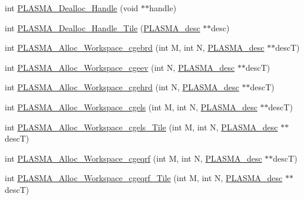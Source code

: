 \begin{DoxyCompactItemize}
\item 
int \hyperlink{group__Auxiliary_gaa9eda06e52cb5dc6d0bda9a21cde8b1f_gaa9eda06e52cb5dc6d0bda9a21cde8b1f}{P\+L\+A\+S\+M\+A\+\_\+\+Dealloc\+\_\+\+Handle} (void $\ast$$\ast$handle)
\item 
int \hyperlink{group__Auxiliary_gace7f20780aab355943e7d16dd285f051_gace7f20780aab355943e7d16dd285f051}{P\+L\+A\+S\+M\+A\+\_\+\+Dealloc\+\_\+\+Handle\+\_\+\+Tile} (\hyperlink{structplasma__desc__t}{P\+L\+A\+S\+M\+A\+\_\+desc} $\ast$$\ast$desc)
\item 
int \hyperlink{group__Auxiliary_ga9347ba6bb13a85aec69faa151a4679cc_ga9347ba6bb13a85aec69faa151a4679cc}{P\+L\+A\+S\+M\+A\+\_\+\+Alloc\+\_\+\+Workspace\+\_\+cgebrd} (int M, int N, \hyperlink{structplasma__desc__t}{P\+L\+A\+S\+M\+A\+\_\+desc} $\ast$$\ast$desc\+T)
\item 
int \hyperlink{group__Auxiliary_gae0761822c4284e93410cc0c4d3b9481d_gae0761822c4284e93410cc0c4d3b9481d}{P\+L\+A\+S\+M\+A\+\_\+\+Alloc\+\_\+\+Workspace\+\_\+cgeev} (int N, \hyperlink{structplasma__desc__t}{P\+L\+A\+S\+M\+A\+\_\+desc} $\ast$$\ast$desc\+T)
\item 
int \hyperlink{group__Auxiliary_gaf3a8bf0773137be15a83eee6c275cc39_gaf3a8bf0773137be15a83eee6c275cc39}{P\+L\+A\+S\+M\+A\+\_\+\+Alloc\+\_\+\+Workspace\+\_\+cgehrd} (int N, \hyperlink{structplasma__desc__t}{P\+L\+A\+S\+M\+A\+\_\+desc} $\ast$$\ast$desc\+T)
\item 
int \hyperlink{group__Auxiliary_ga8651b83a212d76deebb60a569f9e1e81_ga8651b83a212d76deebb60a569f9e1e81}{P\+L\+A\+S\+M\+A\+\_\+\+Alloc\+\_\+\+Workspace\+\_\+cgels} (int M, int N, \hyperlink{structplasma__desc__t}{P\+L\+A\+S\+M\+A\+\_\+desc} $\ast$$\ast$desc\+T)
\item 
int \hyperlink{group__Auxiliary_gaa18fd044b60c50604149bfff131223ce_gaa18fd044b60c50604149bfff131223ce}{P\+L\+A\+S\+M\+A\+\_\+\+Alloc\+\_\+\+Workspace\+\_\+cgels\+\_\+\+Tile} (int M, int N, \hyperlink{structplasma__desc__t}{P\+L\+A\+S\+M\+A\+\_\+desc} $\ast$$\ast$desc\+T)
\item 
int \hyperlink{group__Auxiliary_ga835ad6d1681b21ce4a881882aee51096_ga835ad6d1681b21ce4a881882aee51096}{P\+L\+A\+S\+M\+A\+\_\+\+Alloc\+\_\+\+Workspace\+\_\+cgeqrf} (int M, int N, \hyperlink{structplasma__desc__t}{P\+L\+A\+S\+M\+A\+\_\+desc} $\ast$$\ast$desc\+T)
\item 
int \hyperlink{group__Auxiliary_gaac8b6cee62771666fdd43aba2299b427_gaac8b6cee62771666fdd43aba2299b427}{P\+L\+A\+S\+M\+A\+\_\+\+Alloc\+\_\+\+Workspace\+\_\+cgeqrf\+\_\+\+Tile} (int M, int N, \hyperlink{structplasma__desc__t}{P\+L\+A\+S\+M\+A\+\_\+desc} $\ast$$\ast$desc\+T)
$$
\end{DoxyCompactItemize}
